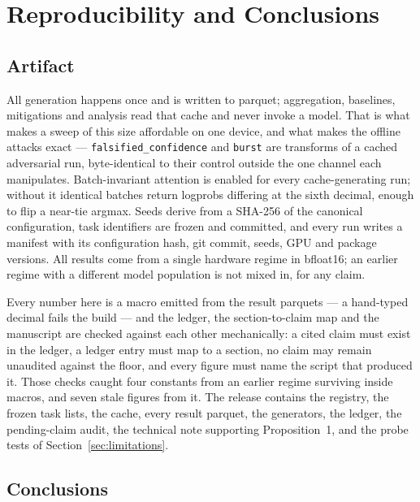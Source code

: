 \section{Reproducibility and Conclusions}
\label{sec:reproducibility}

\subsection{Artifact}

All generation happens once and is written to parquet; aggregation, baselines,
mitigations and analysis read that cache and never invoke a model. That is what
makes a sweep of this size affordable on one device, and what makes the offline
attacks exact --- \texttt{falsified\_confidence} and \texttt{burst} are transforms
of a cached adversarial run, byte-identical to their control outside the one
channel each manipulates. Batch-invariant attention is enabled for every
cache-generating run; without it identical batches return logprobs differing at
the sixth decimal, enough to flip a near-tie argmax. Seeds derive from a SHA-256
of the canonical configuration, task identifiers are frozen and committed, and
every run writes a manifest with its configuration hash, git commit, seeds, GPU
and package versions. All results come from a single hardware regime in bfloat16;
an earlier regime with a different model population is not mixed in, for any
claim.

Every number here is a macro emitted from the result parquets --- a hand-typed
decimal fails the build --- and the ledger, the section-to-claim map and the
manuscript are checked against each other mechanically: a cited claim must exist
in the ledger, a ledger entry must map to a section, no claim may remain
unaudited against the floor, and every figure must name the script that produced
it. Those checks caught four constants from an earlier regime surviving inside
macros, and seven stale figures from it. The release contains the registry, the
frozen task lists, the cache, every result parquet, the generators, the ledger,
the pending-claim audit, the technical note supporting Proposition~1, and the
probe tests of Section~\ref{sec:limitations}. 

\subsection{Conclusions}


